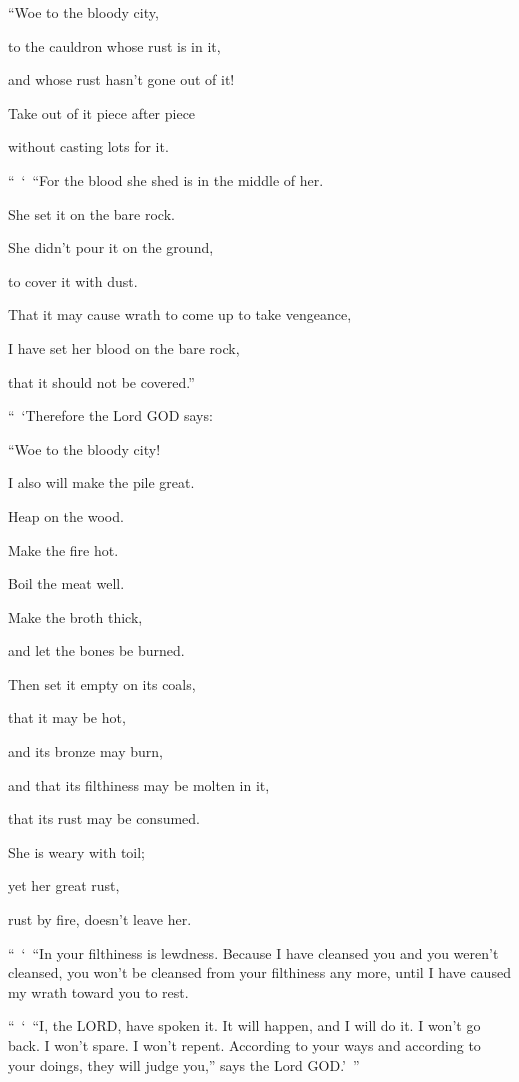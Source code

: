 “Woe to the bloody city,

to the cauldron whose rust is in it,

and whose rust hasn’t gone out of it!

Take out of it piece after piece

without casting lots for it.


\vspace{\baselineskip} \myverse{}“ ‘ “For the blood she shed is in the middle of her.

She set it on the bare rock.

She didn’t pour it on the ground,

to cover it with dust.

\myverse{}That it may cause wrath to come up to take vengeance,

I have set her blood on the bare rock,

that it should not be covered.”

\myverse{}“ ‘Therefore the Lord GOD says:

“Woe to the bloody city!

I also will make the pile great.

\myverse{}Heap on the wood.

Make the fire hot.

Boil the meat well.

Make the broth thick,

and let the bones be burned.

\myverse{}Then set it empty on its coals,

that it may be hot,

and its bronze may burn,

and that its filthiness may be molten in it,

that its rust may be consumed.

\myverse{}She is weary with toil;

yet her great rust,

rust by fire, doesn’t leave her.

\myverse{}“ ‘ “In your filthiness is lewdness. Because I have cleansed you
and you weren’t cleansed, you won’t be cleansed from your filthiness any more, until I have caused my
wrath toward you to rest.

\myverse{}“ ‘ “I, the LORD, have spoken it. It will happen, and I will do
it. I won’t go back. I won’t spare. I won’t repent. According to your ways and according to your doings,
they will judge you,” says the Lord GOD.’ ”

